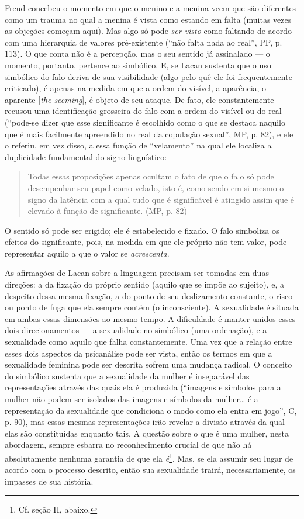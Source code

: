 Freud concebeu o momento em que o menino e a menina veem que são
diferentes como um trauma no qual a menina é vista como estando em falta
(muitas vezes as objeções começam aqui). Mas algo só pode \emph{ser
visto} como faltando de acordo com uma hierarquia de valores
pré-existente (``não falta nada ao real'', PP, p. 113). O que conta não
é a percepção, mas o seu sentido já assinalado --- o momento, portanto,
pertence ao simbólico. E, se Lacan sustenta que o uso simbólico do falo
deriva de sua visibilidade (algo pelo quê ele foi frequentemente
criticado), é apenas na medida em que a ordem do visível, a aparência, o
aparente {[}\emph{the seeming}{]}, é objeto de seu ataque. De fato, ele
constantemente recusou uma identificação grosseira do falo com a ordem
do visível ou do real (``pode-se dizer que esse significante é escolhido
como o que se destaca naquilo que é mais facilmente apreendido no real
da copulação sexual'', MP, p. 82), e ele o referiu, em vez disso, a essa
função de ``velamento'' na qual ele localiza a duplicidade fundamental
do signo linguístico:

\begin{quote}
Todas essas proposições apenas ocultam o fato de que o falo só pode
desempenhar seu papel como velado, isto é, como sendo em si mesmo o
signo da latência com a qual tudo que é significável é atingido assim
que é elevado à função de significante. (MP, p. 82)
\end{quote}

O sentido só pode ser erigido; ele é estabelecido e fixado. O falo
simboliza os efeitos do significante, pois, na medida em que ele próprio
não tem valor, pode representar aquilo a que o valor se
\emph{acrescenta}.

As afirmações de Lacan sobre a linguagem precisam ser tomadas em duas
direções: a da fixação do próprio sentido (aquilo que se impõe ao
sujeito), e, a despeito dessa mesma fixação, a do ponto de seu
deslizamento constante, o risco ou ponto de fuga que ela sempre contém
(o inconsciente). A sexualidade é situada em ambas essas dimensões ao
mesmo tempo. A dificuldade é manter unidos esses dois direcionamentos ---
a sexualidade no simbólico (uma ordenação), e a sexualidade como aquilo
que falha constantemente. Uma vez que a relação entre esses dois
aspectos da psicanálise pode ser vista, então os termos em que a
sexualidade feminina pode ser descrita sofrem uma mudança radical. O
conceito do simbólico sustenta que a sexualidade da mulher é inseparável
das representações através das quais ela é produzida (``imagens e
símbolos para a mulher não podem ser isolados das imagens e símbolos da
mulher\ldots{} é a representação da sexualidade que condiciona o modo como
ela entra em jogo'', C, p. 90), mas essas mesmas representações irão
revelar a divisão através da qual elas são constituídas enquanto tais. A
questão sobre o que é uma mulher, nesta abordagem, sempre esbarra no
reconhecimento crucial de que não há absolutamente nenhuma garantia de
que ela \emph{é}\footnote{Cf. seção II, abaixo.}. Mas, se ela assumir
seu lugar de acordo com o processo descrito, então sua sexualidade
trairá, necessariamente, os impasses de sua história.

